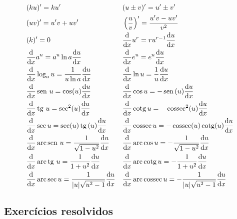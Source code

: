 \cleardoublepage\documentclass[../main.tex]{subfiles}
\begin{document}
\begin{small}
\begin{align}
  & (ku)' = ku' && (u\pm v)' = u' \pm v'\\
  & (uv)' = u'v + uv' && \left(\frac{u}{v}\right)' = \frac{u'v - uv'}{v^2} \\
  & (k)' = 0 && \frac{\dd}{\dd x}u^r = ru^{r-1}\frac{\dd u}{\dd x}\\
  & \frac{\dd}{\dd x}a^u = a^u\ln a\frac{\dd u}{\dd x} && \frac{\dd}{\dd x}e^u = e^u\frac{\dd u}{\dd x} \\
  & \frac{\dd}{\dd x}\log_a u = \frac{1}{u\ln a}\frac{\dd u}{\dd x} && \frac{\dd}{\dd x}\ln u = \frac{1}{u}\frac{\dd u}{\dd x} \\
  & \frac{\dd}{\dd x}\sen u = \cos(u)\frac{\dd u}{\dd x} && \frac{\dd}{\dd x}\cos u = - \sen(u)\frac{\dd u}{\dd x}\\
  & \frac{\dd}{\dd x}\tg u = \sec^2(u)\frac{\dd u}{\dd x} && \frac{\dd}{\dd x}\cotg u = -\cossec^2(u)\frac{\dd u}{\dd x} \\
  & \frac{\dd}{\dd x}\sec u = \sec(u)\tg(u)\frac{\dd u}{\dd x} && \frac{\dd}{\dd x}\cossec u = -\cossec(u)\cotg(u)\frac{\dd u}{\dd x} \\
  &\frac{\dd}{\dd x}\arc\sen u = \frac{1}{\sqrt{1-u^2}}\frac{\dd u}{\dd x} && \frac{\dd}{\dd x}\arc\cos u = -\frac{1}{\sqrt{1-u^2}}\frac{\dd u}{\dd x} \\
  &\frac{\dd}{\dd x}\arc\tg u = \frac{1}{1+u^2}\frac{\dd u}{\dd x} && \frac{\dd}{\dd x}\arc\cotg u = -\frac{1}{1+u^2}\frac{\dd u}{\dd x} \\
  &\frac{\dd}{\dd x}\arc\sec u = \frac{1}{|u|\sqrt{u^2-1}}\frac{\dd u}{\dd x} && \frac{\dd}{\dd x}\arc\cossec u = -\frac{1}{|u|\sqrt{u^2-1}}\frac{\dd u}{\dd x}
\end{align}
\end{small}

\subsection{Exercícios resolvidos}
\end{document}
